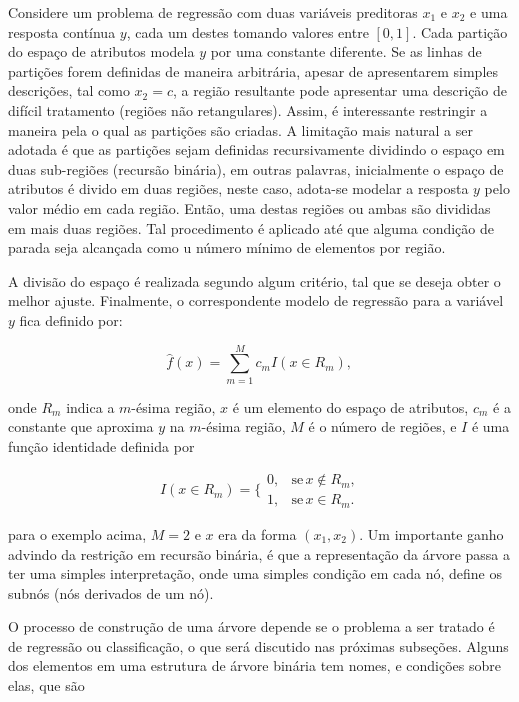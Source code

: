Considere um problema de regressão com duas variáveis preditoras $x_1$ e $x_2$ e uma resposta contínua $y$, cada um destes tomando valores entre $[0,1]$. Cada partição do espaço de atributos modela $y$ por uma constante diferente. Se as linhas de partições forem definidas de maneira arbitrária, apesar de apresentarem simples descrições, tal como $x_2=c$, a região resultante pode apresentar uma descrição de difícil tratamento (regiões não retangulares). Assim, é interessante restringir a maneira pela o qual as partições são criadas. A limitação mais natural a ser adotada é que as partições sejam definidas recursivamente dividindo o espaço em duas sub-regiões (recursão binária), em outras palavras, inicialmente o espaço de atributos é divido em duas regiões, neste caso, adota-se modelar a resposta $y$ pelo valor médio em cada região. Então, uma destas regiões ou ambas são divididas em mais duas regiões. Tal procedimento é aplicado até que alguma condição de parada seja alcançada como u número mínimo de elementos por região.

A divisão do espaço é realizada segundo algum critério, tal que se deseja obter o melhor ajuste. Finalmente, o correspondente modelo de regressão para a variável $y$ fica definido por:

\begin{equation}\label{eq:treeresponse}
\hat{f}(x)=\sum_{m=1}^Mc_mI(x\in{R_m})\mbox{,}~
\end{equation}

onde $R_m$ indica a $m$-ésima região, $x$ é um elemento do espaço de atributos, $c_m$ é a constante que aproxima $y$ na $m$-ésima região, $M$ é o número de regiões, e $I$ é uma função identidade definida por

\begin{equation}
I(x\in{R_m})=\Big\{\begin{array}{cc}
0,&\mbox{se}\, x\notin{R_m}\mbox{,}\\
1,&\mbox{se}\, x\in{R_m}\mbox{.}
\end{array}
\end{equation}

\noindent
para o exemplo acima, $M=2$ e $x$ era da forma $(x_1, x_2)$. Um importante ganho advindo da restrição em recursão binária, é que a representação da árvore passa a ter uma simples interpretação, onde uma simples condição em cada nó, define os subnós (nós derivados de um nó).

O processo de construção de uma árvore depende se o problema a ser tratado é de regressão ou classificação, o que será discutido nas próximas subseções. Alguns dos elementos em uma estrutura de árvore binária tem nomes, e condições sobre elas, que são

